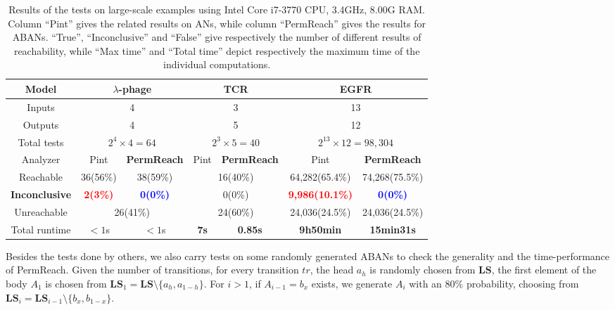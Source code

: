 \documentclass[runningheads]{llncs}
\begin{document}
\begin{table}[ht]
\centering
    \begin{tabular}{|c|c|c|c|c|c|c|}
    \hline
  	Model	&\multicolumn{2}{c|}{$\lambda$-phage}	&	  \multicolumn{2}{c|}{TCR} & \multicolumn{2}{c|}{EGFR}  \\
    \hline
    Inputs&\multicolumn{2}{c|}{4}	&	  \multicolumn{2}{c|}{3} & \multicolumn{2}{c|}{13}\\
    \hline
    Outputs&\multicolumn{2}{c|}{4} &	  \multicolumn{2}{c|}{5} & \multicolumn{2}{c|}{12} \\
    \hline
    Total tests&\multicolumn{2}{c|}{$2^4\times 4=64$} & \multicolumn{2}{c|}{$2^3\times 5=40$} & \multicolumn{2}{c|}{$2^{13}\times 12=98,304$}\\
    \hline
    Analyzer  &  Pint       &\textbf{PermReach}    &  Pint       &\textbf{PermReach}   &  Pint       &\textbf{PermReach}             \\
    \hline
    Reachable    & 36(56\%)& 38(59\%)   &  \multicolumn{2}{c|}{16(40\%)}  & 64,282(65.4\%)&74,268(75.5\%)\\
    \hline
    \textbf{Inconclusive} & \textcolor{red}{\textbf{2(3\%)}}&\textcolor{blue}{\textbf{0(0\%)}}& \multicolumn{2}{c|}{0(0\%)}    &\textcolor{red}{\textbf{9,986(10.1\%)}}&\textcolor{blue}{\textbf{0(0\%)}}  \\
    \hline
    Unreachable     &  \multicolumn{2}{c|}{26(41\%)} &  \multicolumn{2}{c|}{24(60\%)} &24,036(24.5\%)&24,036(24.5\%)\\
    \hline
    Total runtime &  $<1$s       &  $<1$s &  \textbf{7s}       &  \textbf{0.85s}        & \textbf{9h50min}              & \textbf{15min31s}      \\
    \hline
    \end{tabular}
\caption{Results of the tests on large-scale examples using Intel Core i7-3770 CPU, \@3.4GHz, 8.00G RAM. 
Column “Pint” gives the related results on ANs, while column “PermReach” gives the results for ABANs. 
“True”, “Inconclusive” and “False” give respectively the number of different results of reachability, while “Max time” and “Total time” depict respectively the maximum time of the individual computations.}
\label{tab:2}
\end{table}

Besides the tests done by others, we also carry tests on some randomly generated ABANs to check the generality and the time-performance of PermReach. 
Given the number of transitions, for every transition $tr$, the head $a_h$ is randomly chosen from $\mathbf{LS}$, the first element of the body $A_1$ is chosen from $\mathbf{LS}_1=\mathbf{LS}\setminus \{a_h,a_{1-h}\}$.
For $i>1$, if $A_{i-1}=b_x$ exists, we generate $A_i$ with an 80\% probability, choosing from $\mathbf{LS}_i=\mathbf{LS}_{i-1}\setminus \{b_x,b_{1-x}\}$. 
 
\end{document}

